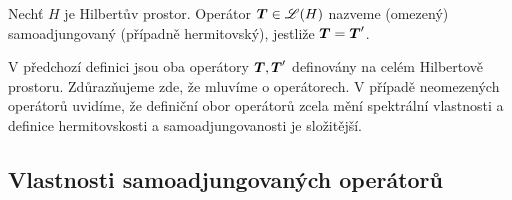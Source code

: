 \begin{definition}
Nechť $H$ je Hilbertův prostor. Operátor $\boldsymbol{T} \in \mathscr{L}(H)$ nazveme (omezený) samoadjungovaný  (případně hermitovský), jestliže $\boldsymbol{T} = \boldsymbol{T}'$.
\end{definition}
\begin{remark}
V předchozí definici jsou oba operátory $\boldsymbol{T}, \boldsymbol{T}'$ definovány na celém Hilbertově prostoru. Zdůrazňujeme zde, že mluvíme o  operátorech. V případě neomezených operátorů uvidíme, že definiční obor operátorů zcela mění spektrální vlastnosti a definice hermitovskosti a samoadjungovanosti je složitější.
\end{remark}

\subsection{Vlastnosti samoadjungovaných operátorů}

